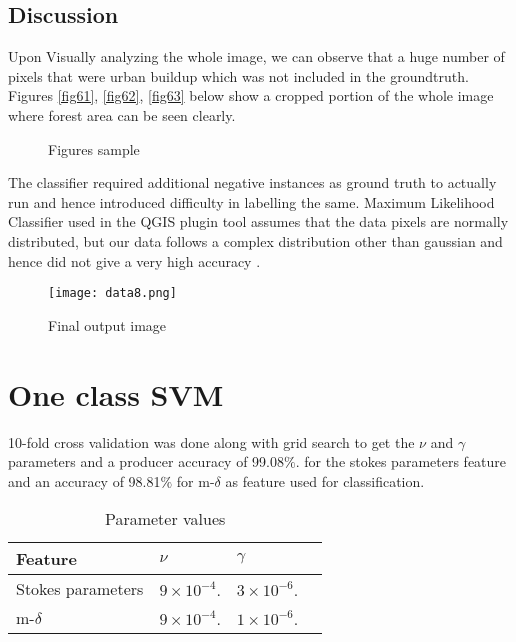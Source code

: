 \subsection{Discussion}
Upon Visually analyzing the whole image, we can observe that a huge number of pixels that were urban buildup which was not included in the groundtruth.  Figures \ref{fig61}, \ref{fig62}, \ref{fig63} below show a cropped portion of the whole image where forest area can be seen clearly.
\begin{figure} [!htbp]
\centering    
{}
\caption{Figures sample}
\end{figure}
The classifier required additional negative instances as ground truth to actually run and hence introduced difficulty in labelling the same. Maximum Likelihood Classifier used in the QGIS plugin tool assumes that the data pixels are normally distributed, but our data follows a complex distribution other than gaussian and hence did not give a very high accuracy . 
\begin{figure} [!htbp]
\centering    
\texttt{[image: data8.png]}
\caption{Final output image}
\end{figure}


\section{One class SVM}

10-fold cross validation was done along with grid search to get the $\nu$ and $\gamma$ parameters and a producer accuracy of 99.08$\%$. for the stokes parameters feature and an accuracy of 98.81$\%$ for m-$\delta$ as feature used for classification.

\begin{table}[!htbp]
\centering
\caption{Parameter values}
\label{tab2}
\begin{tabular}{llll}

\hline
Feature  & $\nu$ & $\gamma$     \\\hline
Stokes parameters   & $9 \times 10^{-4}.$ & $3 \times 10^{-6}.$ \\\hline
m-$\delta$            & $9 \times 10^{-4}.$ & $1 \times 10^{-6}.$ \\\hline
\end{tabular}
\end{table}

